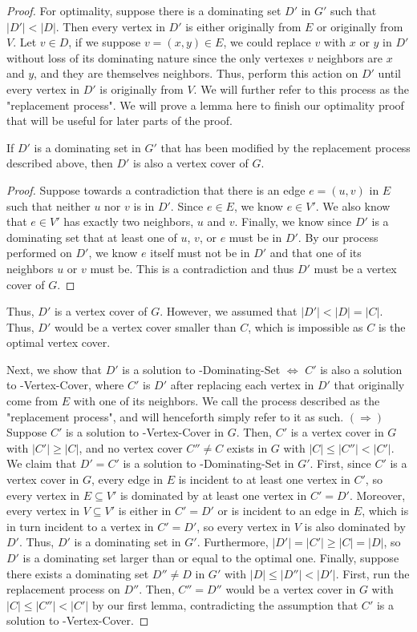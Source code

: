 \begin{proof}
    For optimality, suppose there is a dominating set $D'$ in $G'$ such that $|D'| <|D|$. Then every vertex in $D'$ is either originally from $E$ or originally from $V$. Let $v \in D$, if we suppose $v = (x,y) \in E$, we could replace $v$ with $x$ or $y$ in $D'$ without loss of its dominating nature since the only vertexes $v$ neighbors are $x$ and $y$, and they are themselves neighbors. Thus, perform this action on $D'$ until every vertex in $D'$ is originally from $V$. We will further refer to this process as the "replacement process". We will prove a lemma here to finish our optimality proof that will be useful for later parts of the proof.
    \begin{lemma}
        If $D'$ is a dominating set in $G'$ that has been modified by the replacement process described above, then $D'$ is also a vertex cover of $G$.
    \end{lemma}
    \begin{proof}
        Suppose towards a contradiction that there is an edge $e = (u,v)$ in $E$ such that neither $u$ nor $v$ is in $D'$. Since $e\in E$, we know $e \in V'$. We also know that $e \in V'$ has exactly two neighbors, $u$ and $v$. Finally, we know since $D'$ is a dominating set that at least one of $u$, $v$, or $e$ must be in $D'$. By our process performed on $D'$, we know $e$ itself must not be in $D'$ and that one of its neighbors $u$ or $v$ must be. This is a contradiction and thus $D'$ must be a vertex cover of $G$. 
    \end{proof}
    Thus, $D'$ is a vertex cover of $G$. However, we assumed that $|D'| < |D| = |C|$. Thus, $D'$ would be a vertex cover smaller than $C$, which is impossible as $C$ is the optimal vertex cover.

    Next, we show that $D'$ is a solution to \inob{}-Dominating-Set $\iff$ $C'$ is also a solution to \inob{}-Vertex-Cover, where $C'$ is $D'$ after replacing each vertex in $D'$ that originally come from $E$ with one of its neighbors. We call the process described as the "replacement process", and will henceforth simply refer to it as such.
    $(\Rightarrow)$ Suppose $C'$ is a solution to \inob{}-Vertex-Cover in $G$. Then, $C'$ is a vertex cover in $G$ with $|C'| \geq |C|$, and no vertex cover $C'' \neq C$ exists in $G$ with $|C| \leq |C''| < |C'|$. We claim that $D' = C'$ is a solution to \inob{}-Dominating-Set in $G'$. First, since $C'$ is a vertex cover in $G$, every edge in $E$ is incident to at least one vertex in $C'$, so every vertex in $E \subseteq V'$ is dominated by at least one vertex in $C' = D'$. Moreover, every vertex in $V \subseteq V'$ is either in $C' = D'$ or is incident to an edge in $E$, which is in turn incident to a vertex in $C' = D'$, so every vertex in $V$ is also dominated by $D'$. Thus, $D'$ is a dominating set in $G'$. Furthermore, $|D'| = |C'| \geq |C| = |D|$, so $D'$ is a dominating set larger than or equal to the optimal one. Finally, suppose there exists a dominating set $D'' \neq D$ in $G'$ with $|D| \leq |D''| < |D'|$. First, run the replacement process on $D''$. Then, $C'' = D''$ would be a vertex cover in $G$ with $|C| \leq |C''| < |C'|$ by our first lemma, contradicting the assumption that $C'$ is a solution to \inob{}-Vertex-Cover.


\end{proof}

